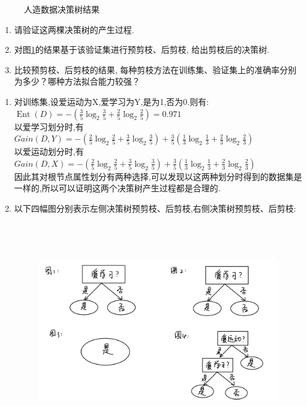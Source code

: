 \documentclass[answers]{exam}  %
\begin{document}
\begin{questions}
\begin{figure}[ht]
        \caption{人造数据决策树结果}\label{ch4_fig:decision_tree_1}
    \end{figure}
    \begin{enumerate}
        \item
              请验证这两棵决策树的产生过程.
        \item
              对图\ref{ch4_fig:decision_tree_1}的结果基于该验证集进行预剪枝、后剪枝, 给出剪枝后的决策树.
        \item
              比较预剪枝、后剪枝的结果, 每种剪枝方法在训练集、验证集上的准确率分别为多少？哪种方法拟合能力较强？
    \end{enumerate}

    \begin{solution}
        \begin{enumerate}
            \item 对训练集,设爱运动为X,爱学习为Y,是为1,否为0.则有:
                  $\operatorname{Ent}(D)=-(\frac{3}{5} \log_2\frac{3}{5} +\frac{2}{5} \log_2\frac{2}{5})=0.971$\\
                  以爱学习划分时,有$Gain(D,Y)=-(\frac{2}{5} \log_2 \frac{2}{5} +\frac{3}{5} \log_2\frac{3}{5})+\frac{3}{5} (\frac{1}{3} \log_2\frac{1}{3} +\frac{2}{3} \log_2\frac{2}{3})$\\
                  以爱运动划分时,有$Gain(D,X)=-(\frac{2}{5} \log_2 \frac{2}{5} +\frac{3}{5} \log_2\frac{3}{5})+\frac{3}{5} (\frac{1}{3} \log_2\frac{1}{3} +\frac{2}{3} \log_2\frac{2}{3})$\\
                  因此其对根节点属性划分有两种选择,可以发现以这两种划分时得到的数据集是一样的,所以可以证明这两个决策树产生过程都是合理的.
            \item 以下四幅图分别表示左侧决策树预剪枝、后剪枝,右侧决策树预剪枝、后剪枝:
                  \begin{figure}[H]
                      \centering
                      \includegraphics[height=9.5cm]{IMG_0163.png}

\end{figure}
\end{enumerate}
\end{solution}
\end{questions}
\end{document}
